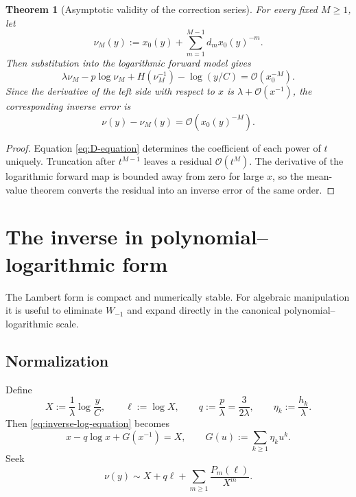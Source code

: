 \documentclass[11pt,oneside]{article}
\numberwithin{equation}{section}
\theoremstyle{plain}
\newtheorem{theorem}{Theorem}[section]
\theoremstyle{definition}
\theoremstyle{remark}
\newcommand{\Ord}{\mathcal O}
\begin{document}
\begin{theorem}[Asymptotic validity of the correction series]
\label{thm:inverse-validity}
For every fixed $M\ge1$, let
\[
 \nu_M(y):=x_0(y)+\sum_{m=1}^{M-1}d_mx_0(y)^{-m}.
\]
Then substitution into the logarithmic forward model gives
\begin{equation}\label{eq:inverse-residual}
 \lambda\nu_M-p\log\nu_M+H(\nu_M^{-1})
 -\log(y/C)=\Ord(x_0^{-M}).
\end{equation}
Since the derivative of the left side with respect to $x$ is
$\lambda+\Ord(x^{-1})$, the corresponding inverse error is
\begin{equation}\label{eq:inverse-error}
 \nu(y)-\nu_M(y)=\Ord(x_0(y)^{-M}).
\end{equation}
\end{theorem}

\begin{proof}
Equation \eqref{eq:D-equation} determines the coefficient of each power of
$t$ uniquely.  Truncation after $t^{M-1}$ leaves a residual
$\Ord(t^M)$.  The derivative of the logarithmic forward map is bounded away
from zero for large $x$, so the mean-value theorem converts the residual
into an inverse error of the same order.
\end{proof}

\section{The inverse in polynomial--logarithmic form}\label{sec:inverse-pl}

The Lambert form is compact and numerically stable.  For algebraic
manipulation it is useful to eliminate $W_{-1}$ and expand directly in the
canonical polynomial--logarithmic scale.

\subsection{Normalization}

Define
\begin{equation}\label{eq:X-ell-q}
 X:=\frac1\lambda\log\frac yC,
 \qquad \ell:=\log X,
 \qquad q:=\frac p\lambda=\frac{3}{2\lambda},
 \qquad \eta_k:=\frac{h_k}{\lambda}.
\end{equation}
Then \eqref{eq:inverse-log-equation} becomes
\begin{equation}\label{eq:normalized-inverse-equation}
 x-q\log x+G(x^{-1})=X,
 \qquad G(u):=\sum_{k\ge1}\eta_ku^k.
\end{equation}
Seek
\begin{equation}\label{eq:PL-ansatz}
 \boxed{
 \nu(y)\sim X+q\ell+\sum_{m\ge1}\frac{P_m(\ell)}{X^m}.}
\end{equation}
\end{document}
